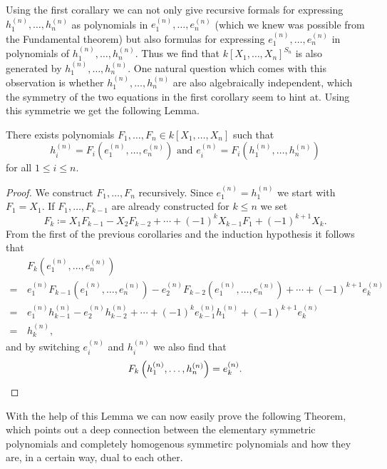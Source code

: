 Using the first corallary we can not only give recursive formals for expressing $h^{(n)}_1, \dotsc, h^{(n)}_n$ as polynomials in $e^{(n)}_1, \dotsc, e^{(n)}_n$ (which we knew was possible from the Fundamental theorem) but also formulas for expressing $e^{(n)}_1, \dotsc, e^{(n)}_n$ in polynomials of $h^{(n)}_1, \dotsc, h^{(n)}_n$.
Thus we find that $k[X_1, \dotsc, X_n]^{S_n}$ is also generated by $h^{(n)}_1, \dotsc, h^{(n)}_n$.
One natural question which comes with this observation is whether $h^{(n)}_1, \dotsc, h^{(n)}_n$ are also algebraically independent, which the symmetry of the two equations in the first corollary seem to hint at.
Using this symmetrie we get the following Lemma.


\begin{lemma}
  There exists polynomials $F_1, \dotsc, F_n \in k[X_1, \dotsc, X_n]$ such that
  \[
      h^{(n)}_i
    = F_i\left(e^{(n)}_1, \dotsc, e^{(n)}_n\right)
    \text{ and }
      e^{(n)}_i
    = F_i\left(h^{(n)}_1, \dotsc, h^{(n)}_n\right)
  \]
  for all $1 \leq i \leq n$.
\end{lemma}
\begin{proof}
  We construct $F_1, \dotsc, F_n$ recursively.
  Since $e^{(n)}_1 = h^{(n)}_1$ we start with $F_1 = X_1$.
  If $F_1, \dotsc, F_{k-1}$ are already constructed for $k \leq n$ we set
  \[
              F_k
    \coloneqq   X_1 F_{k-1}
              - X_2 F_{k-2}
              + \dotsb
              + (-1)^k X_{k-1} F_1
              + (-1)^{k+1} X_k.
  \]
  From the first of the previous corollaries and the induction hypothesis it follows that
  \begin{align*}
     &\,  F_k\left(e^{(n)}_1, \dotsc, e^{(n)}_n\right) \\
    =&\,    e^{(n)}_1 F_{k-1}\left( e^{(n)}_1, \dotsc, e^{(n)}_n \right)
          - e^{(n)}_2 F_{k-2}\left( e^{(n)}_1, \dotsc, e^{(n)}_n \right)
          + \dotsb
          + (-1)^{k+1} e^{(n)}_k \\
    =&\,    e^{(n)}_1 h^{(n)}_{k-1}
          - e^{(n)}_2 h^{(n)}_{k-2}
          + \dotsb
          + (-1)^k e^{(n)}_{k-1} h^{(n)}_1
          + (-1)^{k+1} e^{(n)}_k \\
    =&\,  h^{(n)}_k,
  \end{align*}
  and by switching $e^{(n)}_i$ and $h^{(n)}_i$ we also find that
  \[
      F_k\left(h^{(n)}_1, \dotsc, h^{(n)}_n\right)
    = e^{(n)}_k.
    \qedhere
  \]
\end{proof}


With the help of this Lemma we can now easily prove the following Theorem, which points out a deep connection between the elementary symmetric polynomials and completely homogenous symmetirc polynomials and how they are, in a certain way, dual to each other.


